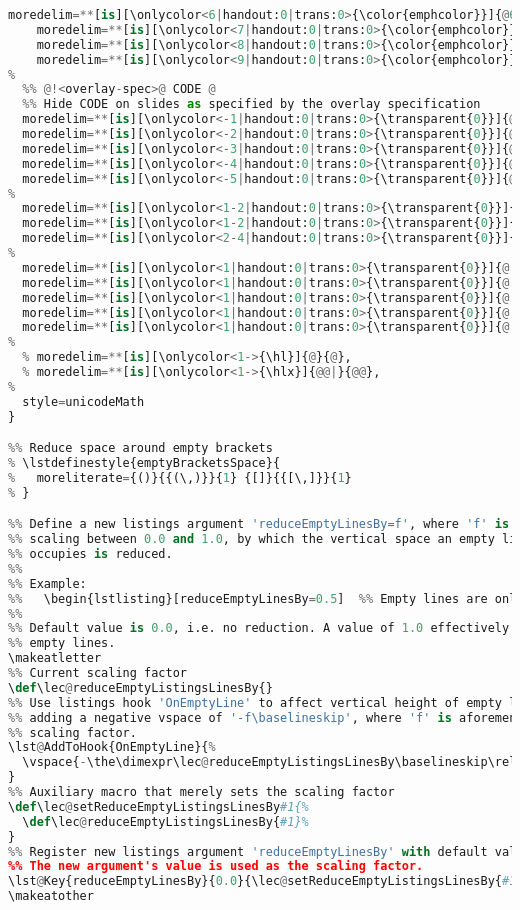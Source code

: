 {\begin{lstlisting}[language=Python,style=normal,escapechar=?,morekeywords={True, False}, mathescape]
	moredelim=**[is][\onlycolor<6|handout:0|trans:0>{\color{emphcolor}}]{@6@}{@},
	moredelim=**[is][\onlycolor<7|handout:0|trans:0>{\color{emphcolor}}]{@7@}{@},
	moredelim=**[is][\onlycolor<8|handout:0|trans:0>{\color{emphcolor}}]{@8@}{@},
	moredelim=**[is][\onlycolor<9|handout:0|trans:0>{\color{emphcolor}}]{@9@}{@},
%
  %% @!<overlay-spec>@ CODE @
  %% Hide CODE on slides as specified by the overlay specification
  moredelim=**[is][\onlycolor<-1|handout:0|trans:0>{\transparent{0}}]{@!-2@}{@},
  moredelim=**[is][\onlycolor<-2|handout:0|trans:0>{\transparent{0}}]{@!-3@}{@},
  moredelim=**[is][\onlycolor<-3|handout:0|trans:0>{\transparent{0}}]{@!-4@}{@},
  moredelim=**[is][\onlycolor<-4|handout:0|trans:0>{\transparent{0}}]{@!-5@}{@},
  moredelim=**[is][\onlycolor<-5|handout:0|trans:0>{\transparent{0}}]{@!-6@}{@},
%
  moredelim=**[is][\onlycolor<1-2|handout:0|trans:0>{\transparent{0}}]{@!1-2@}{@},
  moredelim=**[is][\onlycolor<1-2|handout:0|trans:0>{\transparent{0}}]{@!1-3@}{@},
  moredelim=**[is][\onlycolor<2-4|handout:0|trans:0>{\transparent{0}}]{@!2-4@}{@},
%
  moredelim=**[is][\onlycolor<1|handout:0|trans:0>{\transparent{0}}]{@!1@}{@},
  moredelim=**[is][\onlycolor<1|handout:0|trans:0>{\transparent{0}}]{@!2@}{@},
  moredelim=**[is][\onlycolor<1|handout:0|trans:0>{\transparent{0}}]{@!3@}{@},
  moredelim=**[is][\onlycolor<1|handout:0|trans:0>{\transparent{0}}]{@!4@}{@},
  moredelim=**[is][\onlycolor<1|handout:0|trans:0>{\transparent{0}}]{@!5@}{@},
%
  % moredelim=**[is][\onlycolor<1->{\hl}]{@}{@},
  % moredelim=**[is][\onlycolor<1->{\hlx}]{@@|}{@@},
%
  style=unicodeMath
}

%% Reduce space around empty brackets
% \lstdefinestyle{emptyBracketsSpace}{
%   moreliterate={()}{{(\,)}}{1} {[]}{{[\,]}}{1}
% }

%% Define a new listings argument 'reduceEmptyLinesBy=f', where 'f' is a factor 
%% scaling between 0.0 and 1.0, by which the vertical space an empty line 
%% occupies is reduced.
%%
%% Example:
%%   \begin{lstlisting}[reduceEmptyLinesBy=0.5]  %% Empty lines are only half as heigh
%%
%% Default value is 0.0, i.e. no reduction. A value of 1.0 effectively skips 
%% empty lines.
\makeatletter
%% Current scaling factor
\def\lec@reduceEmptyListingsLinesBy{}
%% Use listings hook 'OnEmptyLine' to affect vertical height of empty lines, by
%% adding a negative vspace of '-f\baselineskip', where 'f' is aforementioned 
%% scaling factor.
\lst@AddToHook{OnEmptyLine}{%
  \vspace{-\the\dimexpr\lec@reduceEmptyListingsLinesBy\baselineskip\relax}%
}
%% Auxiliary macro that merely sets the scaling factor
\def\lec@setReduceEmptyListingsLinesBy#1{%
  \def\lec@reduceEmptyListingsLinesBy{#1}%
}
%% Register new listings argument 'reduceEmptyLinesBy' with default value '0.0.
%% The new argument's value is used as the scaling factor.
\lst@Key{reduceEmptyLinesBy}{0.0}{\lec@setReduceEmptyListingsLinesBy{#1}}
\makeatother


\end{lstlisting}}
